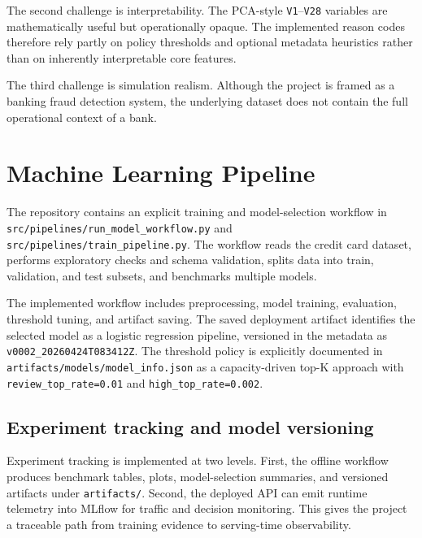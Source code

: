 \documentclass[11pt]{article}
\newcommand{\code}[1]{\texttt{#1}}
\begin{document}
The second challenge is interpretability. The PCA-style \code{V1}--\code{V28} variables are mathematically useful but operationally opaque. The implemented reason codes therefore rely partly on policy thresholds and optional metadata heuristics rather than on inherently interpretable core features.

The third challenge is simulation realism. Although the project is framed as a banking fraud detection system, the underlying dataset does not contain the full operational context of a bank.

\section{Machine Learning Pipeline}
The repository contains an explicit training and model-selection workflow in \code{src/pipelines/run_model_workflow.py} and \code{src/pipelines/train_pipeline.py}. The workflow reads the credit card dataset, performs exploratory checks and schema validation, splits data into train, validation, and test subsets, and benchmarks multiple models.

The implemented workflow includes preprocessing, model training, evaluation, threshold tuning, and artifact saving. The saved deployment artifact identifies the selected model as a logistic regression pipeline, versioned in the metadata as \code{v0002\_20260424T083412Z}. The threshold policy is explicitly documented in \code{artifacts/models/model_info.json} as a capacity-driven top-K approach with \code{review_top_rate=0.01} and \code{high_top_rate=0.002}.

\subsection{Experiment tracking and model versioning}
Experiment tracking is implemented at two levels. First, the offline workflow produces benchmark tables, plots, model-selection summaries, and versioned artifacts under \code{artifacts/}. Second, the deployed API can emit runtime telemetry into MLflow for traffic and decision monitoring. This gives the project a traceable path from training evidence to serving-time observability.
\end{document}
